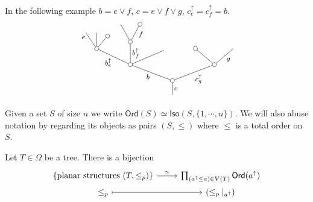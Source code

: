 \documentclass[a4paper,10pt]{article}%
\begin{document}
\begin{example} In the following example $b = e \vee f$, $c = e \vee f \vee g$, $c^{\uparrow}_e= c^{\uparrow}_f =b$.
\[
	\begin{tikzpicture}[grow=up,auto,level distance=1.9em,
	every node/.style = {font=\footnotesize,inner sep=2pt},
	dummy/.style={circle,draw,inner sep=0pt,minimum size=1.75mm}]
		\node at (0,0) {}
			child{node [dummy] {}
				child[sibling distance = 10em]{node [dummy] {}
					child[sibling distance = 4.5em]{
					edge from parent node [swap] {$g$}}
					child[sibling distance = 4.5em]{node [dummy] {}}
				edge from parent node [swap] {$c_g^{\uparrow}$}}
				child[sibling distance = 10em]{node [dummy] {}
					child[sibling distance = 4em,level distance=1.7em]
					child[sibling distance = 1.5em,level distance=2.7em]{node [dummy] {}
						child[level distance=2.1em,sibling distance = 2.3em]{node [dummy] {}
						edge from parent node [near end,swap] {$f$}}		
						child[level distance=2.1em,sibling distance = 2.3em]{
						edge from parent node [near end] {}}
					edge from parent node [swap] {$b^{\uparrow}_{f}$}}
					child[sibling distance = 4em]{node [dummy] {}
						child[sibling distance =1.3em, level distance = 1.5 em]{node [dummy]  {}
						edge from parent node [swap] {}}
						child[sibling distance = 1.3em]{
						edge from parent node [very near end,swap] {}}
						child[sibling distance =1.3em]{
						edge from parent node [very near end] {$e$}}
					edge from parent node {$b^{\uparrow}_e$}}
				edge from parent node {$b$}}
			edge from parent node [swap] {$c$}};
	\end{tikzpicture}
\]
\end{example}


Given a set $S$ of size $n$ we write
$\textsf{Ord}(S) \simeq \mathsf{Iso}(S,\{1,\cdots,n\})$. We will also abuse notation by regarding its objects as pairs $(S,\leq)$ where $\leq$ is a total order on $S$.



\begin{proposition}\label{PLANARIZATIONCHAR PROP}
	Let $T \in \Omega$ be a tree. There is a bijection
\[
	\begin{tikzcd}[row sep = 0em]
		\{\text{planar structures }(T,\leq_p)\} \ar{r}{\simeq} &
		\prod_{(a^{\uparrow} \leq a) \in V(T)} \mathsf{Ord}(a^{\uparrow}) \\
		\leq_p \ar[mapsto]{r} & (\leq_p|_{a^{\uparrow}})
	\end{tikzcd}	
\]
\end{proposition}
\end{document}
